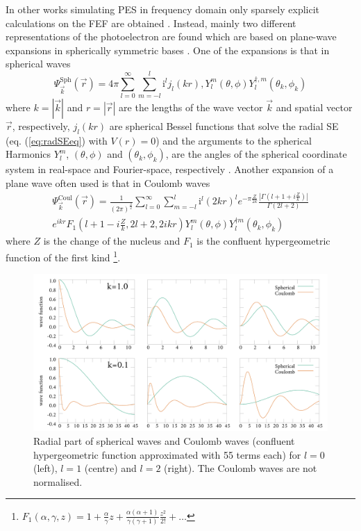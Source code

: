 In other works simulating PES in frequency domain only sparsely explicit calculations on the FEF are obtained \cite{ContOrb,H2pDeCleva}.
Instead, mainly two different representations of the photoelectron are found which are based on plane-wave expansions in spherically symmetric bases \cite{ezDyson,DO_TDDFT,do_modCoul}.
One of the expansions is that in spherical waves \cite{Lifschitz}
\begin{equation} \label{eq:spherWave}
\Psi^\text{Sph}_{\vec{k}}(\vec{r})=4\pi
\sum_{l=0}^\infty \sum_{m=-l}^l \text{i}^l j_l\left(kr\right), Y_l^m\left(\theta, \phi\right) Y^{\dagger,m}_l\left(\theta_k, \phi_k\right)
\end{equation}
where $k=|\vec{k}|$ and $r=|\vec{r}|$ are the lengths of the wave vector $\vec{k}$ and spatial vector $\vec{r}$, respectively, $j_l(kr)$ are spherical Bessel functions that solve the radial SE (eq. (\ref{eq:radSEeq}) with $V(r)=0$) and the arguments to the spherical Harmonics $Y_l^m$, $(\theta,\phi)$ and $(\theta_k,\phi_k)$, are the angles of the spherical coordinate system in real-space and Fourier-space, respectively \cite{ezDyson}.
Another expansion of a plane wave often used is that in Coulomb waves
\begin{multline} \label{eq:CoulWave}
\Psi^\text{Coul}_{\vec{k}}(\vec{r})=\frac{1}{(2\pi)^{\frac{3}{2}}}
\sum_{l=0}^\infty \sum_{m=-l}^l \text{i}^l (2kr)^l e^{-\pi\frac{Z}{2k}} \frac{|\Gamma(l+1+i\frac{Z}{k})|}{\Gamma(2l+2)} \\
e^{ikr} F_1(l+1-i\frac{Z}{k}, 2l+2, 2ikr) 
Y_l^m\left(\theta, \phi\right) Y^{\dagger m}_l\left(\theta_k, \phi_k\right)
\end{multline}
where $Z$ is the change of the nucleus and $F_1$ is the confluent hypergeometric function of the first kind \cite{do_modCoul,ColWave} \footnote{$F_1(\alpha,\gamma,z)=1+\frac{\alpha}{\gamma}z + \frac{\alpha (\alpha+1)}{\gamma (\gamma+1)} \frac{z^2}{2!}+\hdots $}.
\begin{figure}
\includegraphics[width=\textwidth]{Figures/RBF/RadialPart}
\caption{Radial part of spherical waves and Coulomb waves (confluent hypergeometric function approximated with 55 terms each) for $l=0$ (left), $l=1$ (centre) and $l=2$ (right).
The Coulomb waves are not normalised.}
\label{fig:RadFun}
\end{figure}

